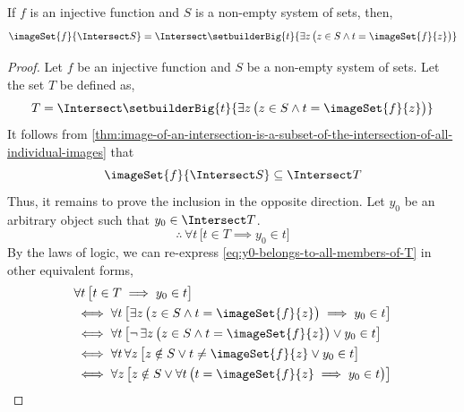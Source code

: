 \begin{thm}
    \label{thm:for-injective-functions-the-image-of-intersection-is-equal-to-the-intersection-of-images}
    If \( f \) is an injective function and \( S \) is a non-empty system of sets, then,
    \begin{equation*}
        \imageSet{f}{\Intersect S} = \Intersect \setbuilderBig{t}{\exists z \, \big( z \in S \land t = \imageSet{f}{z} \big)}
    \end{equation*}
\end{thm}

\begin{proof}
    Let \( f \) be an injective function and \( S\) be a non-empty system of sets.
    Let the set \( T \) be defined as,
    \begin{equation*}
        T = \Intersect \setbuilderBig{t}{\exists z \, \big( z \in S \land t = \imageSet{f}{z} \big)}
    \end{equation*}
    It follows from \cref{thm:image-of-an-intersection-is-a-subset-of-the-intersection-of-all-individual-images} that
    \begin{equation*}
        \imageSet{f}{\Intersect S} \subseteq \Intersect T
    \end{equation*}
    Thus, it remains to prove the inclusion in the opposite direction.
    Let \( y_{0} \) be an arbitrary object such that \( y_{0} \in \Intersect T \).
    \begin{equation}
        \label{eq:y0-belongs-to-all-members-of-T}
        \therefore \, \forall t \, \big[ t \in T \implies y_{0} \in t \big]
    \end{equation}
    By the laws of logic, we can re-express \eqref{eq:y0-belongs-to-all-members-of-T} in other equivalent forms,
    \begin{align}
        \label{eq:y0-belongs-to-all-memebers-of-T-final-form}
        &\forall t \, \big[ t \in T \implies y_{0} \in t \big] \notag \\
        &\iff
        \forall t \, \big[ \exists z \, \big( z \in S \land t = \imageSet{f}{z} \big) \implies y_{0} \in t \big] \notag \\
        &\iff
        \forall t \, \big[ \lnot \, \exists z \, \big( z \in S \land t = \imageSet{f}{z} \big) \lor  y_{0} \in t \big] \notag \\
        &\iff
        \forall t \, \forall z \, \big[ z \notin S \lor t \neq \imageSet{f}{z} \lor y_{0} \in t \big] \notag \\
        &\iff
        \forall z \, \big[ z \notin S \lor \forall t \, \big( t = \imageSet{f}{z} \implies y_{0} \in t \big) \big] \notag \\

\end{align}
\end{proof}
